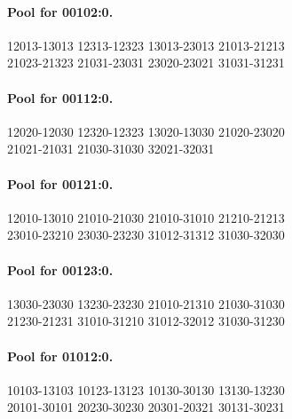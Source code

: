 \documentclass[11pt]{article}
\theoremstyle{remark}
\numberwithin{equation}{section}
\numberwithin{table}{section}
\begin{document}
\paragraph{Pool for 00102:0.}
\begingroup\footnotesize\ttfamily\begin{flushleft}
12013-13013 12313-12323 13013-23013 21013-21213\\
21023-21323 21031-23031 23020-23021 31031-31231\\
\end{flushleft}\endgroup
\paragraph{Pool for 00112:0.}
\begingroup\footnotesize\ttfamily\begin{flushleft}
12020-12030 12320-12323 13020-13030 21020-23020\\
21021-21031 21030-31030 32021-32031\\
\end{flushleft}\endgroup
\paragraph{Pool for 00121:0.}
\begingroup\footnotesize\ttfamily\begin{flushleft}
12010-13010 21010-21030 21010-31010 21210-21213\\
23010-23210 23030-23230 31012-31312 31030-32030\\
\end{flushleft}\endgroup
\paragraph{Pool for 00123:0.}
\begingroup\footnotesize\ttfamily\begin{flushleft}
13030-23030 13230-23230 21010-21310 21030-31030\\
21230-21231 31010-31210 31012-32012 31030-31230\\
\end{flushleft}\endgroup
\paragraph{Pool for 01012:0.}
\begingroup\footnotesize\ttfamily\begin{flushleft}
10103-13103 10123-13123 10130-30130 13130-13230\\
20101-30101 20230-30230 20301-20321 30131-30231\\
\end{flushleft}\endgroup
\end{document}
